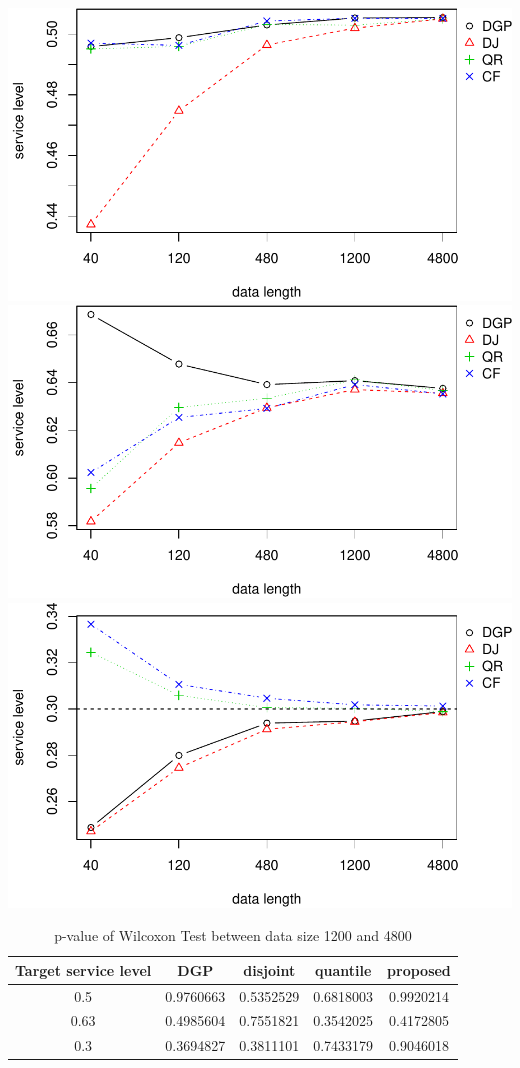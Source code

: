 \documentclass[
]{article}
\begin{document}
\includegraphics{linear-norm-plot_files/figure-latex/sl-1.pdf}
\includegraphics{linear-norm-plot_files/figure-latex/sl-2.pdf}
\includegraphics{linear-norm-plot_files/figure-latex/sl-3.pdf}

\begin{table}

\caption{\label{tab:Wilcoxon}p-value of Wilcoxon Test between data size 1200 and 4800}
\centering
\begin{tabular}[t]{ccccc}
\toprule
Target service level & DGP & disjoint & quantile & proposed\\
\midrule
\rowcolor{gray!6}  0.5 & 0.9760663 & 0.5352529 & 0.6818003 & 0.9920214\\
0.63 & 0.4985604 & 0.7551821 & 0.3542025 & 0.4172805\\
\rowcolor{gray!6}  0.3 & 0.3694827 & 0.3811101 & 0.7433179 & 0.9046018\\
\bottomrule
\end{tabular}
\end{table}
\end{document}
